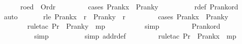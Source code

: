 \begin{isabellebody}
\ \ \ \ \isamarkupfalse%
\ roed\ {\isacharcolon}{\kern0pt}\ {\isachardoublequoteopen}Ord{\isacharparenleft}{\kern0pt}r{\isacharparenright}{\kern0pt}{\isachardoublequoteclose}\ \isanewline
\ \ \ \ \ \ \isamarkupfalse%
\ {\isacharparenleft}{\kern0pt}cases\ {\isachardoublequoteopen}P{\isacharunderscore}{\kern0pt}rank{\isacharparenleft}{\kern0pt}x{\isacharparenright}{\kern0pt}\ {\isasymle}\ P{\isacharunderscore}{\kern0pt}rank{\isacharparenleft}{\kern0pt}y{\isacharparenright}{\kern0pt}{\isachardoublequoteclose}{\isacharparenright}{\kern0pt}\ \ \isanewline
\ \ \ \ \ \ \isamarkupfalse%
\ r{\isacharunderscore}{\kern0pt}def\ P{\isacharunderscore}{\kern0pt}rank{\isacharunderscore}{\kern0pt}ord\ \isamarkupfalse%
\ auto\ \isanewline
\isanewline
\ \ \ \ \isamarkupfalse%
\ rle{\isacharcolon}{\kern0pt}\ {\isachardoublequoteopen}P{\isacharunderscore}{\kern0pt}rank{\isacharparenleft}{\kern0pt}x{\isacharparenright}{\kern0pt}\ {\isasymle}\ r\ {\isasymand}\ P{\isacharunderscore}{\kern0pt}rank{\isacharparenleft}{\kern0pt}y{\isacharparenright}{\kern0pt}\ {\isasymle}\ r{\isachardoublequoteclose}\ \isanewline
\ \ \ \ \ \ \isamarkupfalse%
\ {\isacharparenleft}{\kern0pt}cases\ {\isachardoublequoteopen}P{\isacharunderscore}{\kern0pt}rank{\isacharparenleft}{\kern0pt}x{\isacharparenright}{\kern0pt}\ {\isasymle}\ P{\isacharunderscore}{\kern0pt}rank{\isacharparenleft}{\kern0pt}y{\isacharparenright}{\kern0pt}{\isachardoublequoteclose}{\isacharparenright}{\kern0pt}\ \isanewline
\ \ \ \ \ \ \isamarkupfalse%
\ {\isacharparenleft}{\kern0pt}rule{\isacharunderscore}{\kern0pt}tac\ P{\isacharequal}{\kern0pt}{\isachardoublequoteopen}r\ {\isacharequal}{\kern0pt}\ P{\isacharunderscore}{\kern0pt}rank{\isacharparenleft}{\kern0pt}y{\isacharparenright}{\kern0pt}{\isachardoublequoteclose}\ \ mp{\isacharparenright}{\kern0pt}\ \isanewline
\ \ \ \ \ \ \ \ \isamarkupfalse%
\ simp\ \isanewline
\ \ \ \ \ \ \isamarkupfalse%
\ P{\isacharunderscore}{\kern0pt}rank{\isacharunderscore}{\kern0pt}ord\ \isanewline
\ \ \ \ \ \ \ \ \isamarkupfalse%
\ simp\ \isanewline
\ \ \ \ \ \ \ \isamarkupfalse%
\ {\isacharparenleft}{\kern0pt}simp\ add{\isacharcolon}{\kern0pt}r{\isacharunderscore}{\kern0pt}def{\isacharparenright}{\kern0pt}\ \isanewline
\ \ \ \ \ \ \isamarkupfalse%
\ {\isacharparenleft}{\kern0pt}rule{\isacharunderscore}{\kern0pt}tac\ P{\isacharequal}{\kern0pt}{\isachardoublequoteopen}r\ {\isacharequal}{\kern0pt}\ P{\isacharunderscore}{\kern0pt}rank{\isacharparenleft}{\kern0pt}x{\isacharparenright}{\kern0pt}{\isachardoublequoteclose}\ \ mp{\isacharparenright}{\kern0pt}\ \isanewline

\end{isabellebody}
